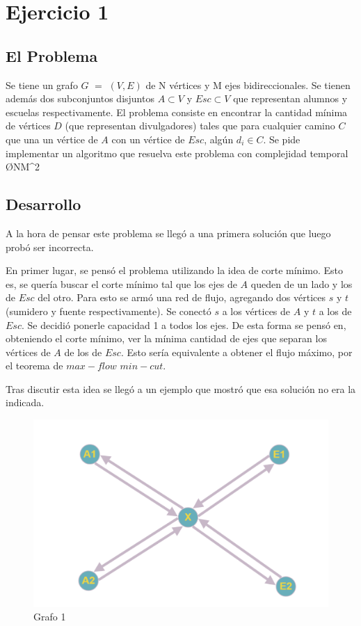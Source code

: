 \section{Ejercicio 1}
\subsection{El Problema}

Se tiene un grafo $G$ $=$ $(V,E)$ de N vértices y M ejes bidireccionales. Se tienen además dos subconjuntos disjuntos $A \subset V$ y $Esc \subset V$ que representan alumnos y escuelas respectivamente. El problema consiste en encontrar la cantidad mínima de vértices $D$ (que representan divulgadores)  tales que para cualquier camino $C$ que una un vértice de $A$ con un vértice de $Esc$, algún $d_i \in C$. Se pide implementar un algoritmo que resuelva este problema con complejidad temporal \O{NM^2}

\subsection{Desarrollo}

A la hora de pensar este problema se llegó a una primera solución que luego probó ser incorrecta. 

En primer lugar, se pensó el problema utilizando la idea de corte mínimo. Esto es, se quería buscar el corte mínimo tal que los ejes de $A$ queden de un lado y los de $Esc$ del otro. Para esto se armó una red de flujo, agregando dos vértices $s$ y $t$ (sumidero y fuente respectivamente). Se conectó $s$ a los vértices de $A$ y $t$ a los de $Esc$. Se decidió ponerle capacidad 1 a todos los ejes. De esta forma se pensó en, obteniendo el corte mínimo, ver la mínima cantidad de ejes que separan los vértices de $A$ de los de $Esc$. Esto sería equivalente a obtener el flujo máximo, por el teorema de $max-flow$ $min-cut$. 

Tras discutir esta idea se llegó a un ejemplo que mostró que esa solución no era la indicada.


\begin{figure}[H]
\centering
\includegraphics[width=15cm]{Imagenes/Ej1a.png}
\caption{Grafo 1}
\end{figure}

